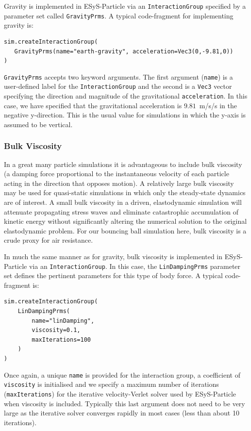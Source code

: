 Gravity is implemented in ESyS-Particle via an \texttt{InteractionGroup} specified by a parameter set called \texttt{GravityPrms}. A typical code-fragment for implementing gravity is:

\begin{verbatim}
sim.createInteractionGroup(
   GravityPrms(name="earth-gravity", acceleration=Vec3(0,-9.81,0))
)
\end{verbatim}

\noindent \texttt{GravityPrms} accepts two keyword arguments. The first argument (\texttt{name}) is a user-defined label for the \texttt{InteractionGroup} and the second is a \texttt{Vec3} vector specifying the direction and magnitude of the gravitational \texttt{acceleration}. In this case, we have specified that the gravitational acceleration is $9.81$~m/s/s in the negative y-direction. This is the usual value for simulations in which the y-axis is assumed to be vertical.

\subsubsection{Bulk Viscosity}

In a great many particle simulations it is advantageous to include bulk viscosity (a damping force proportional to the instantaneous velocity of each particle acting in the direction that opposes motion). A relatively large bulk viscosity may be used for quasi-static simulations in which only the steady-state dynamics are of interest. A small bulk viscosity in a driven, elastodynamic simulation will attenuate propagating stress waves and eliminate catastrophic accumulation of kinetic energy without significantly altering the numerical solution to the original elastodynamic problem. For our bouncing ball simulation here, bulk viscosity is a crude proxy for air resistance. 

In much the same manner as for gravity, bulk viscosity is implemented in ESyS-Particle via an \texttt{InteractionGroup}. In this case, the \texttt{LinDampingPrms} parameter set defines the pertinent parameters for this type of body force. A typical code-fragment is:

\begin{verbatim}
sim.createInteractionGroup(
    LinDampingPrms(
        name="linDamping",
        viscosity=0.1,
        maxIterations=100
    )
)
\end{verbatim}

\noindent
Once again, a unique \texttt{name} is provided for the interaction group, a coefficient of \texttt{viscosity} is initialised and we specify a maximum number of iterations (\texttt{maxIterations}) for the iterative velocity-Verlet solver used by ESyS-Particle when viscosity is included. Typically this last argument does not need to be very large as the iterative solver converges rapidly in most cases (less than about 10 iterations).

